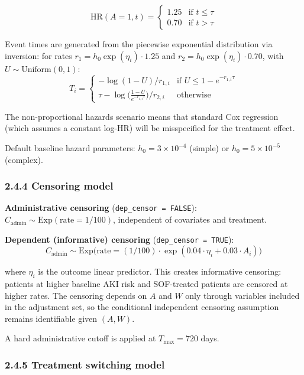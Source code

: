 \documentclass[
  letterpaper,
  DIV=11,
  numbers=noendperiod]{scrartcl}
\begin{document}
\[\text{HR}(A=1, t) = \begin{cases} 1.25 & \text{if } t \leq \tau \\ 0.70 & \text{if } t > \tau \end{cases}\]

Event times are generated from the piecewise exponential distribution
via inversion: for rates \(r_1 = h_0 \exp(\eta_i) \cdot 1.25\) and
\(r_2 = h_0 \exp(\eta_i) \cdot 0.70\), with
\(U \sim \text{Uniform}(0,1)\):
\[T_i = \begin{cases} -\log(1 - U) / r_{1,i} & \text{if } U \leq 1 - e^{-r_{1,i}\tau} \\ \tau - \log\bigl(\frac{1-U}{e^{-r_{1,i}\tau}}\bigr) / r_{2,i} & \text{otherwise} \end{cases}\]

The non-proportional hazards scenario means that standard Cox regression
(which assumes a constant log-HR) will be misspecified for the treatment
effect.

Default baseline hazard parameters: \(h_0 = 3 \times 10^{-4}\) (simple)
or \(h_0 = 5 \times 10^{-5}\) (complex).

\subsubsection{2.4.4 Censoring model}\label{censoring-model}

\textbf{Administrative censoring} (\texttt{dep\_censor\ =\ FALSE}):
\(C_{\text{admin}} \sim \text{Exp}(\text{rate} = 1/100)\), independent
of covariates and treatment.

\textbf{Dependent (informative) censoring}
(\texttt{dep\_censor\ =\ TRUE}):
\[C_{\text{admin}} \sim \text{Exp}\bigl(\text{rate} = (1/100) \cdot \exp(0.04 \cdot \eta_i + 0.03 \cdot A_i)\bigr)\]

where \(\eta_i\) is the outcome linear predictor. This creates
informative censoring: patients at higher baseline AKI risk and
SOF-treated patients are censored at higher rates. The censoring depends
on \(A\) and \(W\) only through variables included in the adjustment
set, so the conditional independent censoring assumption remains
identifiable given \((A, W)\).

A hard administrative cutoff is applied at \(T_{\max} = 720\) days.

\subsubsection{2.4.5 Treatment switching
model}\label{treatment-switching-model}
\end{document}
